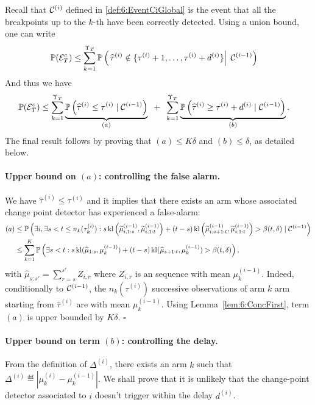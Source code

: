 Recall that $\mathcal{C}^{(i)}$ defined in \eqref{def:6:EventCiGlobal} is the event that all the breakpoints up to the $k$-th have been correctly detected.
Using a union bound, one can write
%
\begin{align*}
    \mathbb{P}(\mathcal{E}_T^c) & \leq \sum\limits_{k=1}^{\Upsilon_T}
    \mathbb{P}\left(\left. \widehat{\tau}^{(i)} \notin \{ \tau^{(i)}+1, \dots, \tau^{(i)} + d^{(i)} \} \right|\; \mathcal{C}^{(i-1)}\right)
\end{align*}
And thus we have
\begin{align*}
    \mathbb{P}(\mathcal{E}_T^c) & \leq \sum\limits_{k=1}^{\Upsilon_T} \underbrace{\mathbb{P}\left(\widehat{\tau}^{(i)} \leq \tau^{(i)} \;|\; \mathcal{C}^{(i-1)}\right)}_{(a)} \;\; + \;\; \sum\limits_{k=1}^{\Upsilon_T} \underbrace{\mathbb{P}\left(\widehat{\tau}^{(i)} \geq \tau^{(i)} + d^{(i)} \;|\; \mathcal{C}^{(i-1)}\right)}_{(b)}.
\end{align*}
%
The final result follows by proving that $(a) \leq K \delta$ and $(b)\leq \delta$, as detailed below.


\paragraph{Upper bound on $(a)$: controlling the false alarm.}
%
We have $\widehat{\tau}^{(i)} \leq \tau^{(i)}$ and it implies that there exists an arm whose associated change point detector has experienced a false-alarm:
%
\begin{align*}
    (a) & \leq \mathbb{P}\left(\exists i, \exists s < t \leq n_k(\tau_k^{(i)}) : s \, \mathrm{kl}\left(\widetilde{\mu}_{i,1:s}^{(i-1)},\widetilde{\mu}_{i,1:t}^{(i-1)}\right) + (t - s) \, \mathrm{kl}\left(\widetilde{\mu}_{i,s+1:t}^{(i-1)},\widetilde{\mu}_{i,1:t}^{(i-1)}\right) > \beta(t, \delta) \;|\; \mathcal{C}^{(i-1)}\right) \\
    & \leq \sum_{k=1}^K\mathbb{P}\left(\exists s < t : s \, \mathrm{kl}(\widehat{\mu}_{1:s},\mu_k^{(i-1)}) + (t - s) \, \mathrm{kl}(\widehat{\mu}_{s+1:t}, \mu_k^{(i-1)}) > \beta(t, \delta)\right),
\end{align*}
with $\widehat{\mu}_{s:s'} = \sum_{r=s}^{s'} Z_{i,r}$ where $Z_{i,r}$ is an \iid{} sequence with mean $\mu_k^{(i-1)}$.
Indeed, conditionally to $\mathcal{C}^{(i-1)}$, the $n_k(\tau^{(i)})$ successive observations of arm $k$ arm starting from $\widehat{\tau}^{(i)}$ are \iid{} with mean $\mu_k^{(i-1)}$.
Using Lemma~\ref{lem:6:ConcFirst}, term $(a)$ is upper bounded by $K\delta$.
%
\hfill{}$\square$

\paragraph{Upper bound on term $(b)$: controlling the delay.}
\label{par:6:controllingDelayInOneProof}
%
From the definition of $\Delta^{(i)}$, there exists an arm $k$ such that $\Delta^{(i)} \eqdef |\mu_k^{(i)} - \mu_k^{(i-1)}|$. We shall prove that it is unlikely that the change-point detector associated to $i$ doesn't trigger within the delay $d^{(i)}$.

